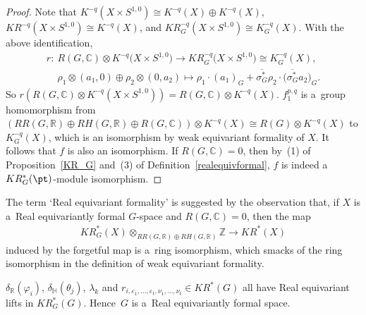 \begin{proof}
Note that $K^{-q}(X\times S^{1, 0})\cong K^{-q}(X)\oplus K^{-q}(X)$, $KR^{-q}(X\times S^{1, 0})\cong K^{-q}(X)$, and
$KR_G^{-q}(X\times S^{1, 0})\cong K_G^{-q}(X)$.
With the above identif\/ication,
\begin{gather*}
r: \ R(G, \mathbb{C})\otimes K^{-q}\big(X\times S^{1, 0}\big)  \to  KR_G^{-q}\big(X\times S^{1, 0}\big)\cong K_G^{-q}(X),
\\
\phantom{r: {}} \
\rho_1\otimes(a_1, 0)\oplus \rho_2\otimes (0, a_2)  \mapsto  \rho_1\cdot (a_1)_G+\overline{\sigma_G^*}
\rho_2\cdot \big(\overline{\sigma_G^*}a_2\big)_G.
\end{gather*}
So $r(R(G, \mathbb{C})\otimes K^{-q}(X\times S^{1, 0}))= R(G, \mathbb{C})\otimes K^{-q}(X)$.
$f_1^{p, q}$ is a~group homomorphism from $(RR(G, \mathbb{R})\oplus RH(G, \mathbb{R})\oplus R(G, \mathbb{C}))\otimes
K^{-q}(X)\cong R(G)\otimes K^{-q}(X)$ to $K_G^{-q}(X)$, which is an isomorphism by weak equivariant formality of $X$.
It follows that $f$ is also an isomorphism.
If $R(G, \mathbb{C})=0$, then by~(1) of Proposition~\ref{KR_G} and~(3) of Def\/inition~\ref{realequivformal}, $f$ is
indeed a~$KR_G^*(\pt)$-module isomorphism.
\end{proof}
\begin{Remark}
The term `Real equivariant formality' is suggested by the observation that, if $X$ is a~Real equivariantly formal
$G$-space and $R(G, \mathbb{C})=0$, then the map
\begin{gather*}
KR^*_G(X)\otimes_{RR(G, \mathbb{R})\oplus RH(G, \mathbb{R})}\mathbb{Z}\to KR^*(X)
\end{gather*}
induced by the forgetful map is a~ring isomorphism, which smacks of the ring isomorphism in the def\/inition of weak
equivariant formality.
\end{Remark}
\begin{Lemma}
\label{realequivlift}
$\delta_\mathbb{R}(\varphi_i)$, $\delta_\mathbb{H}(\theta_j)$, $\lambda_k$ and $r_{i, \varepsilon_1, \dots,
\varepsilon_t, \nu_1, \dots, \nu_t}\in KR^*(G)$ all have Real equivariant lifts in $KR_G^*(G)$.
Hence~$G$ is a~Real equivariantly formal space.
\end{Lemma}
